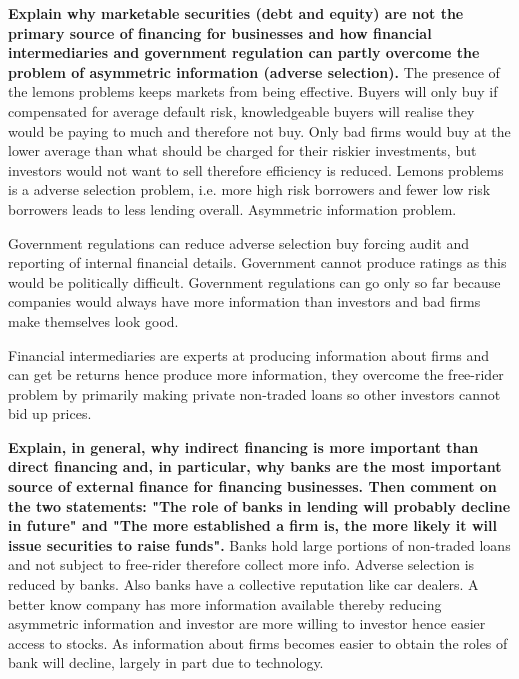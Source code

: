 \documentclass[12pt]{examnotes}
\begin{document}
\textbf{Explain why marketable securities (debt and equity) are not the primary source of financing for businesses and how financial intermediaries and government regulation can partly overcome the problem of asymmetric information (adverse selection).}
The presence of the lemons problems keeps markets from being effective. Buyers will only buy if compensated for average default risk, knowledgeable buyers will realise they would be paying to much and therefore not buy. Only bad firms would buy at the lower average than what should be charged for their riskier investments, but investors would not want to sell therefore efficiency is reduced.
Lemons problems is a adverse selection problem, i.e. more high risk borrowers and fewer low risk borrowers leads to less lending overall. Asymmetric information problem.

Government regulations can reduce adverse selection buy forcing audit and reporting of internal financial details. Government cannot produce ratings as this would be politically difficult. Government regulations can go only so far because companies would always have more information than investors and bad firms make themselves look good.

Financial intermediaries are experts at producing information about firms and can get be returns hence produce more information, they overcome the free-rider problem by primarily making private non-traded loans so other investors cannot bid up prices.

\textbf{Explain, in general, why indirect financing is more important than direct financing and, in particular, why banks are the most important source of external finance for financing businesses. Then comment on the two statements: "The role of banks in lending will probably decline in future" and "The more established a firm is, the more likely it will issue securities to raise funds".}
Banks hold large portions of non-traded loans and not subject to free-rider therefore collect more info. Adverse selection is reduced by banks. Also banks have a collective reputation like car dealers. 
A better know company has more information available thereby reducing asymmetric information and investor are more willing to investor hence easier access to stocks.
As information about firms becomes easier to obtain the roles of bank will decline, largely in part due to technology.
\end{document}
